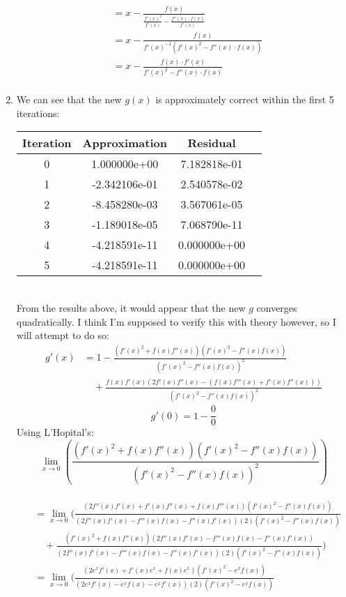 \documentclass{article}
\begin{document}
\begin{enumerate}[label=\alph*.)]
\begin{align*}
&= x - \frac{f(x)}{\frac{f'(x)^2}{f'(x)} - \frac{f''(x) \cdot f(x)}{f'(x)}} \\
&=  x - \frac{f(x)}{f'(x)^{-1}(f'(x)^2 - f''(x) \cdot f(x))} \\
&= x - \frac{f(x) \cdot f'(x)}{f'(x)^2 - f''(x) \cdot f(x)} \\
\end{align*}
\item We can see that the new $g(x)$ is approximately correct within the first 5 iterations: \\
\begin{tabular}{|c|c|c|c|}
\hline
Iteration & Approximation & Residual\\
\hline
0 & 1.000000e+00 & 7.182818e-01\\
\hline
1 & -2.342106e-01 & 2.540578e-02\\
\hline
2 & -8.458280e-03 & 3.567061e-05\\
\hline
3 & -1.189018e-05 & 7.068790e-11\\
\hline
4 & -4.218591e-11 & 0.000000e+00\\
\hline
5 & -4.218591e-11 & 0.000000e+00\\
\hline
\end{tabular} \\
From the results above, it would appear that the new $g$ converges quadratically. I think I'm supposed to verify this with theory however, so I will attempt to do so:\\
\begin{align*}
g'(x) &= 1 - \frac{(f'(x)^2 + f(x)f''(x))(f'(x)^2 - f''(x)f(x))}{(f'(x)^2 - f''(x)f(x))^2} \\
&\quad + \frac{f(x)f'(x)(2f'(x)f''(x) - (f(x)f'''(x) + f'(x)f''(x)))}{(f'(x)^2 - f''(x)f(x))^2}
\end{align*}
\[
g'(0) = 1 - \frac{0}{0}
\]
Using L'Hopital's:\\
\[
\lim_{x \rightarrow 0}(\frac{(f'(x)^2 + f(x)f''(x))(f'(x)^2 - f''(x)f(x))}{(f'(x)^2 - f''(x)f(x))^2}) 
\] \\
\begin{align*}
&= \lim_{x \rightarrow 0}(\frac{(2f''(x)f'(x) + f'(x)f''(x) + f(x)f'''(x))(f'(x)^2 - f''(x)f(x))}{(2f''(x)f'(x) - f'''(x)f(x) - f''(x)f'(x))(2)(f'(x)^2 - f''(x)f(x))} \\
&\quad + \frac{(f'(x)^2 + f(x)f''(x))(2f''(x)f'(x) - f'''(x)f(x) - f''(x)f'(x))}{(2f''(x)f'(x) - f'''(x)f(x) - f''(x)f'(x))(2)(f'(x)^2 - f''(x)f(x))})\\
&= \lim_{x \rightarrow 0}(\frac{(2e^xf'(x) + f'(x)e^x + f(x)e^x)(f'(x)^2 - e^xf(x))}{(2e^xf'(x) - e^xf(x) - e^xf'(x))(2)(f'(x)^2 - e^xf(x))} \\

\end{align*}
\end{enumerate}
\end{document}
